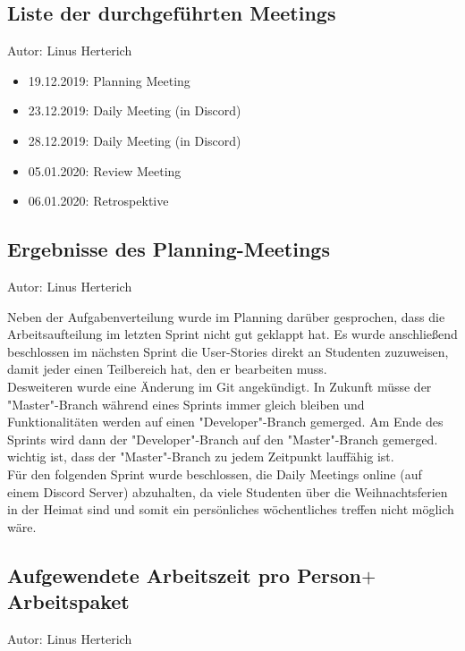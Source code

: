 \subsection{Liste der durchgeführten Meetings}
{\small Autor: Linus Herterich}

\begin{itemize}
  \item 19.12.2019: Planning Meeting
  \item 23.12.2019: Daily Meeting (in Discord)
  \item 28.12.2019: Daily Meeting (in Discord)
  \item 05.01.2020: Review Meeting
  \item 06.01.2020: Retrospektive
\end{itemize}

\subsection{Ergebnisse des Planning-Meetings}
{\small Autor: Linus Herterich}

Neben der Aufgabenverteilung wurde im Planning darüber gesprochen, dass die Arbeitsaufteilung im letzten
Sprint nicht gut geklappt hat. Es wurde anschließend beschlossen im nächsten Sprint die User-Stories direkt
an Studenten zuzuweisen, damit jeder einen Teilbereich hat, den er bearbeiten muss.
\\ Desweiteren wurde eine Änderung im Git angekündigt. In Zukunft müsse der "Master"\--Branch während eines Sprints
immer gleich bleiben und Funktionalitäten werden auf einen "Developer"\--Branch gemerged. Am Ende des Sprints
wird dann der "Developer"\--Branch auf den "Master"\--Branch gemerged. wichtig ist, dass der "Master"\--Branch zu jedem
Zeitpunkt lauffähig ist.
\\ Für den folgenden Sprint wurde beschlossen, die Daily Meetings online (auf einem Discord Server) abzuhalten,
da viele Studenten über die Weihnachtsferien in der Heimat sind und somit ein persönliches wöchentliches treffen
nicht möglich wäre.

\subsection{Aufgewendete Arbeitszeit pro Person$+$Arbeitspaket}
{\small Autor: Linus Herterich}

